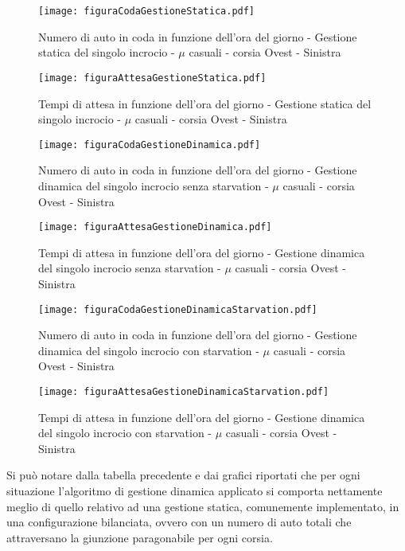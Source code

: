 \begin{figure}[H]
\centering
  \texttt{[image: figuraCodaGestioneStatica.pdf]}
  \caption{Numero di auto in coda in funzione dell'ora del giorno - Gestione statica del singolo incrocio - $\mu$ casuali - corsia Ovest - Sinistra}
  \label{fig:}
\end{figure}

\begin{figure}[H]
\centering
  \texttt{[image: figuraAttesaGestioneStatica.pdf]}
  \caption{Tempi di attesa in funzione dell'ora del giorno - Gestione statica del singolo incrocio - $\mu$ casuali - corsia Ovest - Sinistra}
  \label{fig:}
\end{figure}
\newpage

\begin{figure}[H]
\centering
  \texttt{[image: figuraCodaGestioneDinamica.pdf]}
  \caption{Numero di auto in coda in funzione dell'ora del giorno - Gestione dinamica del singolo incrocio senza starvation - $\mu$ casuali - corsia Ovest - Sinistra}
  \label{fig:}
\end{figure}
\begin{figure}[H]
\centering
  \texttt{[image: figuraAttesaGestioneDinamica.pdf]}
  \caption{Tempi di attesa in funzione dell'ora del giorno - Gestione dinamica del singolo incrocio senza starvation - $\mu$ casuali - corsia Ovest - Sinistra}
  \label{fig:}
\end{figure}
\newpage
\begin{figure}[H]
\centering
  \texttt{[image: figuraCodaGestioneDinamicaStarvation.pdf]}
  \caption{Numero di auto in coda in funzione dell'ora del giorno - Gestione dinamica del singolo incrocio con starvation - $\mu$ casuali - corsia Ovest - Sinistra}
  \label{fig:}
\end{figure}
\begin{figure}[H]
\centering
  \texttt{[image: figuraAttesaGestioneDinamicaStarvation.pdf]}
  \caption{Tempi di attesa in funzione dell'ora del giorno - Gestione dinamica del singolo incrocio con starvation - $\mu$ casuali - corsia Ovest - Sinistra}
  \label{fig:}
\end{figure}
\newpage

Si può notare dalla tabella precedente e dai grafici riportati che per ogni situazione l'algoritmo di gestione dinamica applicato si comporta nettamente meglio di quello relativo ad una gestione statica, comunemente implementato, in una configurazione bilanciata, ovvero con un numero di auto totali che attraversano la giunzione paragonabile per ogni corsia. 

